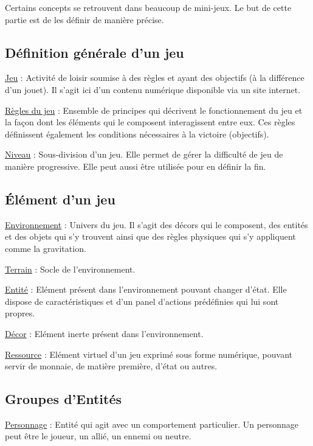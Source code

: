 Certains concepts se retrouvent dans beaucoup de mini-jeux. Le but de cette partie est de les définir de manière précise.

\subsection*{Définition générale d'un jeu}

\underline{Jeu} : 
Activité de loisir soumise à des règles et ayant des objectifs (à la différence d'un jouet). Il s'agit ici d'un contenu numérique
 disponible via un site internet.

\underline{Règles du jeu} : 
Ensemble de principes qui décrivent le fonctionnement du jeu et 
la façon dont les éléments qui le composent interagissent entre eux. 
Ces règles définissent également les conditions nécessaires à la victoire (objectifs).

\underline{Niveau} :
Sous-division d'un jeu. Elle permet de gérer la difficulté de jeu de manière progressive. Elle peut aussi être utilisée pour en définir la fin. 

\subsection*{Élément d'un jeu}

\underline{Environnement} : 
Univers du jeu. Il s'agit des décors qui le composent, des entités et des objets qui s'y trouvent ainsi que 
des règles physiques qui s'y appliquent comme la gravitation.

\underline{Terrain} : 
Socle de l'environnement.

\underline{Entité} : 
Elément présent dans l'environnement pouvant changer d'état. 
Elle dispose de caractéristiques et d'un panel d'actions prédéfinies qui lui sont propres.

\underline{Décor} : 
Elément inerte présent dans l'environnement.

\underline{Ressource} : 
Elément virtuel d'un jeu exprimé sous forme numérique, pouvant servir de monnaie, de matière première, d'état ou autres.

\subsection*{Groupes d'Entités}

\underline{Personnage} :
Entité qui agit avec un comportement particulier. Un personnage peut être le joueur, un allié, un ennemi ou neutre.


